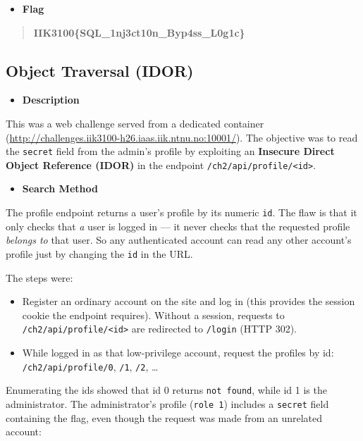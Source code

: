 \documentclass[11pt]{article}
\begin{document}
\begin{itemize}[leftmargin=1.5em]
    \item \textbf{Flag}
\end{itemize}
\begin{quote}
\textbf{IIK3100\{SQL\_1nj3ct10n\_Byp4ss\_L0g1c\}}
\end{quote}

\subsection{Object Traversal (IDOR)}

\begin{itemize}[leftmargin=1.5em]
    \item \textbf{Description}
\end{itemize}
\noindent This was a web challenge served from a dedicated container (\url{http://challenges.iik3100-h26.iaas.iik.ntnu.no:10001/}). The objective was to read the \texttt{secret} field from the admin's profile by exploiting an \textbf{Insecure Direct Object Reference (IDOR)} in the endpoint \texttt{/ch2/api/profile/<id>}.

\begin{itemize}[leftmargin=1.5em]
    \item \textbf{Search Method}
\end{itemize}
\noindent The profile endpoint returns a user's profile by its numeric \texttt{id}. The flaw is that it only checks that \emph{a} user is logged in --- it never checks that the requested profile \emph{belongs to} that user. So any authenticated account can read any other account's profile just by changing the \texttt{id} in the URL.

\noindent The steps were:
\begin{itemize}[leftmargin=2.2em]
    \item Register an ordinary account on the site and log in (this provides the session cookie the endpoint requires). Without a session, requests to \texttt{/ch2/api/profile/<id>} are redirected to \texttt{/login} (HTTP 302).
    \item While logged in as that low-privilege account, request the profiles by id: \texttt{/ch2/api/profile/0}, \texttt{/1}, \texttt{/2}, \ldots
\end{itemize}

\noindent Enumerating the ids showed that id 0 returns \texttt{not found}, while id 1 is the administrator. The administrator's profile (\texttt{role 1}) includes a \texttt{secret} field containing the flag, even though the request was made from an unrelated account:
\end{document}
